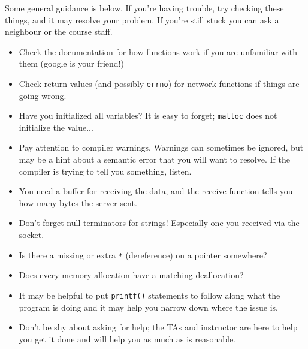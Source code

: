Some general guidance is below. If you're having trouble, try checking these things, and it may resolve your problem. If you're still stuck you can ask a neighbour or the course staff.
\begin{itemize}
	\item Check the documentation for how functions work if you are unfamiliar with them (google is your friend!)
	\item Check return values (and possibly \texttt{errno}) for network functions if things are going wrong.
	\item Have you initialized all variables? It is easy to forget; \texttt{malloc} does not initialize the value...
	\item Pay attention to compiler warnings. Warnings can sometimes be ignored, but may be a hint about a semantic error that you will want to resolve. If the compiler is trying to tell you something, listen.
	\item You need a buffer for receiving the data, and the receive function tells you how many bytes the server sent.
	\item Don't forget null terminators for strings! Especially one you received via the socket.
	\item Is there a missing or extra \texttt{*} (dereference) on a pointer somewhere?
	\item Does every memory allocation have a matching deallocation?
	\item It may be helpful to put \texttt{printf()} statements to follow along what the program is doing and it may help you narrow down where the issue is.
	\item Don't be shy about asking for help; the TAs and instructor are here to help you get it done and will help you as much as is reasonable.
\end{itemize}



